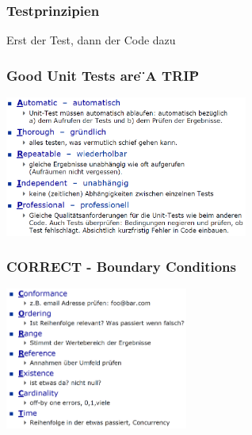 \begin{multicols}{2}
\subsubsection{Testprinzipien}
Erst der Test, dann der Code dazu
\subsubsection{Good Unit Tests are \"{}A TRIP\"{}}
\includegraphics[width=8cm]{images/atrip}
\subsubsection{CORRECT - Boundary Conditions}
\includegraphics[width=6cm]{images/correct}

\end{multicols}
